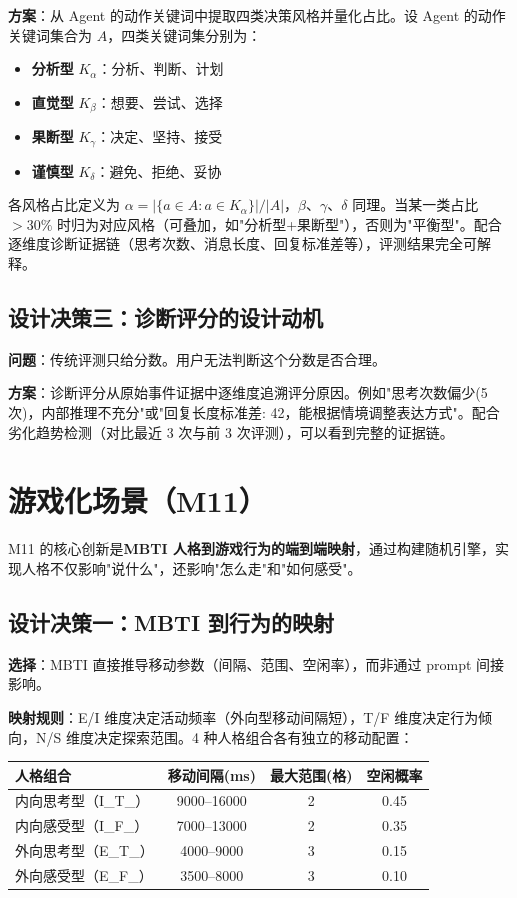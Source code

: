 \documentclass[12pt,a4paper]{article}%
\begin{document}
\textbf{方案}：从 Agent 的动作关键词中提取四类决策风格并量化占比。设 Agent 的动作关键词集合为 $A$，四类关键词集分别为：
\begin{itemize}
	\item \textbf{分析型} $K_\alpha$：分析、判断、计划
	\item \textbf{直觉型} $K_\beta$：想要、尝试、选择
	\item \textbf{果断型} $K_\gamma$：决定、坚持、接受
	\item \textbf{谨慎型} $K_\delta$：避免、拒绝、妥协
\end{itemize}
各风格占比定义为 $\alpha = |\{a \in A : a \in K_\alpha\}| / |A|$，$\beta$、$\gamma$、$\delta$ 同理。当某一类占比 $> 30\%$ 时归为对应风格（可叠加，如"分析型+果断型"），否则为"平衡型"。配合逐维度诊断证据链（思考次数、消息长度、回复标准差等），评测结果完全可解释。

\subsection{设计决策三：诊断评分的设计动机}

\textbf{问题}：传统评测只给分数。用户无法判断这个分数是否合理。

\textbf{方案}：诊断评分从原始事件证据中逐维度追溯评分原因。例如"思考次数偏少(5次)，内部推理不充分"或"回复长度标准差: 42，能根据情境调整表达方式"。配合劣化趋势检测（对比最近 3 次与前 3 次评测），可以看到完整的证据链。

\section{游戏化场景（M11）}

M11 的核心创新是\textbf{MBTI 人格到游戏行为的端到端映射}，通过构建随机引擎，实现人格不仅影响"说什么"，还影响"怎么走"和"如何感受"。

\subsection{设计决策一：MBTI 到行为的映射}

\textbf{选择}：MBTI 直接推导移动参数（间隔、范围、空闲率），而非通过 prompt 间接影响。

\textbf{映射规则}：E/I 维度决定活动频率（外向型移动间隔短），T/F 维度决定行为倾向，N/S 维度决定探索范围。4 种人格组合各有独立的移动配置：

\begin{table}[H]
	\centering
	\begin{tabular}{lccc}
		\toprule
		\textbf{人格组合} & \textbf{移动间隔(ms)} & \textbf{最大范围(格)} & \textbf{空闲概率} \\
		\midrule
		内向思考型（I\_T\_） & 9000--16000 & 2 & 0.45 \\
		内向感受型（I\_F\_） & 7000--13000 & 2 & 0.35 \\
		外向思考型（E\_T\_） & 4000--9000 & 3 & 0.15 \\
		外向感受型（E\_F\_） & 3500--8000 & 3 & 0.10 \\
		\bottomrule
	\end{tabular}
\end{table}
\end{document}
